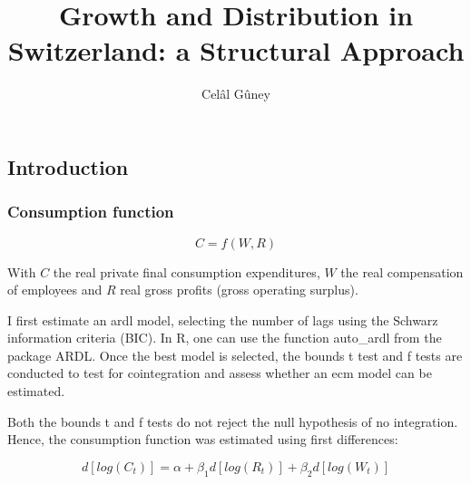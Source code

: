 \documentclass[
  letterpaper,
  DIV=11,
  numbers=noendperiod]{scrartcl}
\title{Growth and Distribution in Switzerland: a Structural Approach}
\author{Celâl Gûney}
\date{}
\begin{document}
\maketitle

\subsection{Introduction}\label{introduction}

\begin{tcolorbox}[enhanced jigsaw, coltitle=black, breakable, colframe=quarto-callout-note-color-frame, bottomtitle=1mm, colbacktitle=quarto-callout-note-color!10!white, titlerule=0mm, bottomrule=.15mm, title=\textcolor{quarto-callout-note-color}{\faInfo}\hspace{0.5em}{The wage share and ISSSSSOUUU}, toprule=.15mm, arc=.35mm, toptitle=1mm, rightrule=.15mm, left=2mm, opacitybacktitle=0.6, leftrule=.75mm, opacityback=0, colback=white]

\end{tcolorbox}

\subsubsection{Consumption function}\label{consumption-function}

\[
C = f(W, R)
\]

With \(C\) the real private final consumption expenditures, \(W\) the
real compensation of employees and \(R\) real gross profits (gross
operating surplus).

I first estimate an ardl model, selecting the number of lags using the
Schwarz information criteria (BIC). In R, one can use the function
auto\_ardl from the package ARDL. Once the best model is selected, the
bounds t test and f tests are conducted to test for cointegration and
assess whether an ecm model can be estimated.

Both the bounds t and f tests do not reject the null hypothesis of no
integration. Hence, the consumption function was estimated using first
differences:

\[
d[log(C_t)] = \alpha + \beta_1d[log(R_t)] + \beta_2d[log(W_t)]
\]
\end{document}
